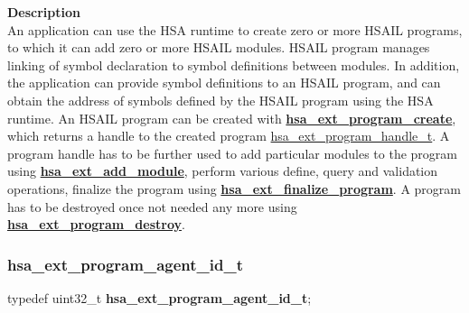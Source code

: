 \documentclass[final]{book}
\newcommand{\reffun}[1]{\textbf{#1}}
\newenvironment{mylongtable}{\rowcolors{0}{lightgray}{lightgray}\longtable} {
\endlongtable}
\begin{document}
\vspace{-4mm}\noindent\textbf{Description}\\[1mm]
An application can use the HSA runtime to create zero or more HSAIL programs, to which it can add zero or more HSAIL modules. HSAIL program manages linking of symbol declaration to symbol definitions between modules. In addition, the application can provide symbol definitions to an HSAIL program, and can obtain the address of symbols defined by the HSAIL program using the HSA runtime. An HSAIL program can be created with \hyperlink{group__ext-linker_1gad67b0ec80bc0e9a18336a68cf741b6e8}{\reffun{hsa_\-ext_\-program_\-create}}, which returns a handle to the created program \hyperlink{group__ext-linker_1gaea8d90863414407ddba7e318db7412f9}{hsa_\-ext_\-program_\-handle_\-t}. A program handle has to be further used to add particular modules to the program using \hyperlink{group__ext-linker_1gaf8d506d1fbdb2cde2392478ea344ca87}{\reffun{hsa_\-ext_\-add_\-module}}, perform various define, query and validation operations, finalize the program using \hyperlink{group__ext-linker_1ga0c592594fa988c24b661146f79120399}{\reffun{hsa_\-ext_\-finalize_\-program}}. A program has to be destroyed once not needed any more using \hyperlink{group__ext-linker_1gad52eaf70ef7263cf188747e64553643f}{\reffun{hsa_\-ext_\-program_\-destroy}}. 


\subsubsection{hsa_\-ext_\-program_\-agent_\-id_\-t}
\vspace{-5.5mm}\begin{mylongtable}{@{}p{\textwidth}}
\rule{0pt}{3ex}\rule[-2.5ex]{0pt}{0pt}typedef uint32_\-t  \hypertarget{group__ext-linker_1gae5495f2eba536530c9dd422c93ae2028}{\textbf{hsa_\-ext_\-program_\-agent_\-id_\-t}};
\end{mylongtable}\vspace{-3mm}
\vspace{-2mm}
\end{document}
